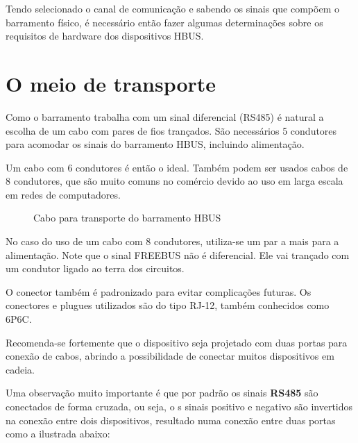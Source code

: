 Tendo selecionado o canal de comunicação e sabendo os sinais que compõem o barramento físico, é necessário então fazer algumas determinações sobre os requisitos de hardware dos dispositivos HBUS.

\section{O meio de transporte}

Como o barramento trabalha com um sinal diferencial (RS485) é natural a escolha de um cabo com pares de fios trançados. São necessários 5 condutores para acomodar os sinais do barramento HBUS, incluindo alimentação.

Um cabo com 6 condutores é então o ideal. Também podem ser usados cabos de 8 condutores, que são muito comuns no comércio devido ao uso em larga escala em redes de computadores.

\begin{figure}[H]
\centering
%
\caption{Cabo para transporte do barramento HBUS}
\end{figure}

No caso do uso de um cabo com 8 condutores, utiliza-se um par a mais para a alimentação. Note que o sinal FREEBUS não é diferencial. Ele vai trançado com um condutor ligado ao terra dos circuitos.

O conector também é padronizado para evitar complicações futuras. Os conectores e plugues utilizados são do tipo RJ-12, também conhecidos como 6P6C.

Recomenda-se fortemente que o dispositivo seja projetado com duas portas para conexão de cabos, abrindo a possibilidade de conectar muitos dispositivos em cadeia.

Uma observação muito importante é que por padrão os sinais \textbf{RS485} são conectados de forma cruzada, ou seja, o s sinais positivo e negativo são invertidos na conexão entre dois dispositivos, resultado numa conexão entre duas portas como a ilustrada abaixo:

